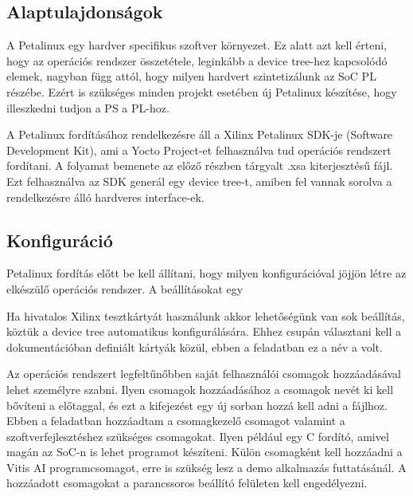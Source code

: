 \subsection{Alaptulajdonságok}
A Petalinux egy hardver specifikus szoftver környezet. Ez alatt azt kell érteni, hogy az operációs rendszer összetétele, leginkább a device tree-hez kapcsolódó elemek, nagyban függ attól, hogy milyen hardvert szintetizálunk az SoC PL részébe. Ezért is szükséges minden projekt esetében új Petalinux készítése, hogy illeszkedni tudjon a PS a PL-hoz.

A Petalinux fordításához rendelkezésre áll a Xilinx Petalinux SDK-je (Software Development Kit), ami a Yocto Project-et felhasználva tud operációs rendszert fordítani. A folyamat bemenete az előző részben tárgyalt .xsa kiterjesztésű fájl. Ezt felhasználva az SDK generál egy device tree-t, amiben fel vannak sorolva a rendelkezésre álló hardveres interface-ek.

\subsection{Konfiguráció}
Petalinux fordítás előtt be kell állítani, hogy milyen konfigurációval jöjjön létre az elkészülő operációs rendszer. A beállításokat egy  

Ha hivatalos Xilinx tesztkártyát használunk akkor lehetőségünk van sok beállítás, köztük a device tree automatikus konfigurálására. Ehhez csupán választani kell a dokumentációban definiált kártyák közül, ebben a feladatban ez a név a  volt.\cite{plnx}

Az operációs rendszert legfeltűnőbben saját felhasználói csomagok hozzáadásával lehet személyre szabni. Ilyen csomagok hozzáadásához a csomagok nevét ki kell bővíteni a  előtaggal, és ezt a kifejezést egy új sorban hozzá kell adni a  fájlhoz. Ebben a feladatban hozzáadtam a  csomagkezelő csomagot valamint a szoftverfejlesztéshez szükséges csomagokat. Ilyen például egy C fordító, amivel magán az SoC-n is lehet programot készíteni. Külön csomagként kell hozzáadni a Vitis AI programcsomagot, erre is szükség lesz a demo alkalmazás futtatásánál. A hozzáadott csomagokat a parancssoros beállító felületen kell engedélyezni.

